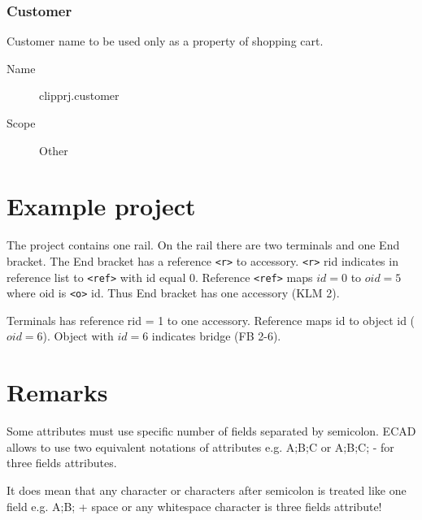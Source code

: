 \documentclass[%
	a4paper,
	oneside,
	listof=numbered,
	parskip=half,
	headsepline=true,
	footsepline=false,
	normalheadings,
	0.7headlines,
	headexclude,
	]{scrbook}
\begin{document}
\subsection{Customer}

Customer name to be used only as a property of shopping cart.

\begin{description}
	\item[Name] clipprj.customer
	\item[Scope] Other
\end{description}

\chapter{Example project}



The project contains one rail. On the rail there are two terminals and one End bracket. The End bracket has a reference \verb|<r>| to accessory. \verb|<r>| rid indicates in reference list to \verb|<ref>| with id equal $0$. Reference \verb|<ref>| maps $id=0$ to $oid=5$ where oid is \verb|<o>| id. Thus End bracket has one accessory (KLM 2).

Terminals has reference rid = 1 to one accessory. Reference maps id to object id ($oid=6$). Object with $id=6$ indicates bridge (FB 2-6). 

\chapter{Remarks}

Some attributes must use specific number of fields separated by semicolon. 
ECAD allows to use two equivalent notations of attributes e.g. A;B;C or A;B;C; - for three fields attributes.

It does mean that any character or characters after semicolon is treated like one field e.g. A;B; + \glqq{}space or any whitespace character\grqq{} is three fields attribute!  

\listoffigures
\listoftables
\lstlistoflistings

%
%
\end{document}
